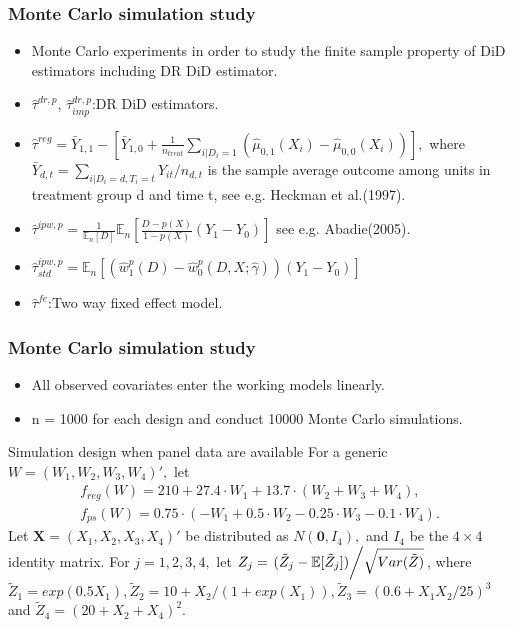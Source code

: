 \documentclass{beamer}
\begin{document}
\begin{frame}\frametitle{Monte Carlo simulation study}
    \begin{itemize}
        \item Monte Carlo experiments in order to study the finite sample property of DiD estimators including DR DiD estimator.
        \item $\widehat{\tau}^{dr, p}$, $\widehat{\tau}^{dr,p}_{imp}$:DR DiD estimators.
        \item $\widehat{\tau}^{reg} = \bar{Y}_{1,1} - \left[\bar{Y}_{1,0}  + \frac{1}{n_{treat}}\sum_{i|D_{i} = 1}(\widehat{\mu}_{0,1}(X_{i}) - \widehat{\mu}_{0,0}(X_{i}))\right],$ where $\bar{Y}_{d,t} = \sum_{i|D_{i} = d, T_{i} = t}Y_{it}/n_{d,t}$ is the sample average outcome among units in treatment group d and time t, see e.g. Heckman et al.(1997).
        \item $\widehat{\tau}^{ipw,p} = \frac{1}{\mathbb{E}_{n}[D]}\mathbb{E}_{n}\left[\frac{D-p(X)}{1-p(X)}(Y_{1} - Y_{0})\right]$ see e.g. Abadie(2005).
        \item $\widehat{\tau}^{ipw,p}_{std} = \mathbb{E}_{n}[(\widehat{w}^{p}_{1}(D) - \widehat{w}^{p}_{0}(D,X;\widehat{\gamma}))(Y_{1} - Y_{0})]$
        \item $\widehat{\tau}^{fe}$:Two way fixed effect model.
    \end{itemize}
\end{frame}

\begin{frame}\frametitle{Monte Carlo simulation study}
    \begin{itemize}
        \item All observed covariates enter the working models linearly.
        \item n = 1000 for each design and conduct 10000 Monte Carlo simulations.
    \end{itemize}
    \footnotesize
    \begin{block}{Simulation design when panel data are available}
        For a generic $W = (W_{1}, W_{2}, W_{3}, W_{4})',$ let
        \begin{align*}
            f_{reg}(W) = 210 + 27.4\cdot W_{1} + 13.7\cdot(W_{2} + W_{3} + W_{4}),\\
            f_{ps}(W) = 0.75\cdot (-W_{1} + 0.5 \cdot W_{2} - 0.25 \cdot W_{3} - 0.1 \cdot W_{4}).
        \end{align*}
        Let $\bm{X} = (X_{1}, X_{2}, X_{3}, X_{4})'$ be distributed as $N(\bm{0}, I_{4}),$ and $I_{4}$ be the $4 \times 4$ identity matrix. For $j = 1,2,3,4,$ let $Z_{j} = \left. (\tilde{Z}_{j} - \mathbb{E}[\tilde{Z}_{j}])\middle/ \sqrt{Var(\tilde{Z})} \right.$, where $\tilde{Z}_{1} = exp(0.5X_{1}), \tilde{Z}_{2} = 10 + X_{2}/(1 + exp(X_{1})), \tilde{Z}_{3} = (0.6 + X_{1}X_{2}/25)^{3}$ and $\tilde{Z}_{4} = (20 + X_{2} + X_{4})^{2}$.
    \end{block}
    \normalsize
\end{frame}
\end{document}
